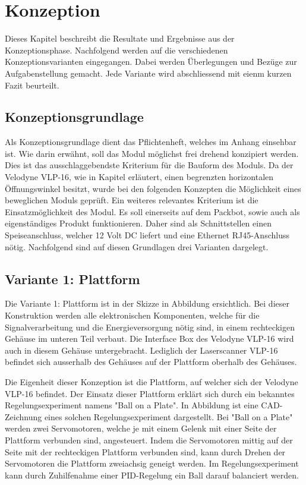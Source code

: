 \chapter{Konzeption}
\label{Konzeption}

Dieses Kapitel beschreibt die Resultate und Ergebnisse aus der Konzeptionsphase. Nachfolgend werden auf die verschiedenen Konzeptionsvarianten eingegangen. Dabei werden Überlegungen und Bezüge zur Aufgabenstellung gemacht. Jede Variante wird abschliessend mit eienm kurzen Fazit beurteilt.

\section{Konzeptionsgrundlage}
Als Konzeptionsgrundlage dient das Pflichtenheft, welches im Anhang  einsehbar ist. Wie darin erwähnt, soll das Modul möglichst frei drehend konzipiert werden. Dies ist das ausschlaggebendste Kriterium für die Bauform des Moduls. Da der Velodyne VLP-16, wie in Kapitel  erläutert, einen begrenzten horizontalen Öffnungswinkel besitzt, wurde bei den folgenden Konzepten die Möglichkeit eines beweglichen Moduls geprüft. Ein weiteres relevantes Kriterium ist die Einsatzmöglichkeit des Modul. Es soll einerseits auf dem Packbot, sowie auch als eigenständiges Produkt funktionieren. Daher sind als Schnittstellen einen Speiseanschluss, welcher 12 Volt DC liefert und eine Ethernet RJ45-Anschluss nötig. Nachfolgend sind auf diesen Grundlagen drei Varianten dargelegt.


\section {Variante 1: Plattform}
\label{var1}
Die Variante 1: Plattform ist in der Skizze in Abbildung  ersichtlich. Bei dieser Konstruktion werden alle elektronischen Komponenten, welche für die Signalverarbeitung und die Energieversorgung nötig sind, in einem rechteckigen Gehäuse im unteren Teil verbaut. Die Interface Box des Velodyne VLP-16 wird auch in diesem Gehäuse untergebracht. Lediglich der Laserscanner VLP-16 befindet sich ausserhalb des Gehäuses auf der Plattform oberhalb des Gehäuses.
	
 Die Eigenheit dieser Konzeption ist die Plattform, auf welcher sich der Velodyne VLP-16 befindet. Der Einsatz dieser Plattform erklärt sich durch ein bekanntes Regelungsexperiment namens "Ball on a Plate". In Abbildung ist eine CAD-Zeichnung eines solchen Regelungsexperiment dargestellt. Bei "Ball on a Plate" werden zwei Servomotoren, welche je mit einem Gelenk mit einer Seite der Plattform verbunden sind, angesteuert. Indem die Servomotoren mittig auf der Seite mit der rechteckigen Plattform verbunden sind, kann durch Drehen der Servomotoren die Plattform zweiachsig geneigt werden. Im Regelungsexperiment kann durch Zuhilfenahme einer PID-Regelung ein Ball darauf balanciert werden. 
 
